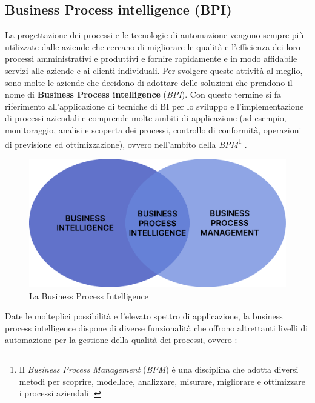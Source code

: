 \subsection{Business Process intelligence (BPI)}

La progettazione dei processi e le tecnologie di automazione vengono sempre più utilizzate dalle aziende che cercano di migliorare le qualità e l'efficienza dei loro processi amministrativi e produttivi e fornire rapidamente e in modo affidabile servizi alle aziende e ai clienti individuali. Per svolgere queste attività al meglio, sono molte le aziende che decidono di adottare delle soluzioni che prendono il nome di \textbf{Business Process intelligence} (\textit{BPI}). Con questo termine si fa riferimento all'applicazione di tecniche di BI per lo sviluppo e l'implementazione di processi aziendali e comprende molte ambiti di applicazione (ad esempio, monitoraggio, analisi e scoperta dei processi, controllo di conformità, operazioni di previsione ed ottimizzazione), ovvero nell'ambito della \textit{BPM}\footnote{Il \textit{Business Process Management} (\textit{BPM}) è una disciplina che adotta diversi metodi per scoprire, modellare, analizzare, misurare, migliorare e ottimizzare i processi aziendali \cite{gartner_bpm}.} \cite{academiaedu_bpi_definition}.

\begin{figure}[H]
    \centering
    \includegraphics[width=0.75\linewidth]{figure//capitolo_3/Business Process Intelligence.pdf}
    \caption{La Business Process Intelligence}
    \label{fig:Business Process Intelligence}
\end{figure}

Date le molteplici possibilità e l'elevato spettro di applicazione, la business process intelligence dispone di diverse funzionalità che offrono altrettanti livelli di automazione per la gestione della qualità dei processi, ovvero \cite{academiaedu_bpi_feautures}:

